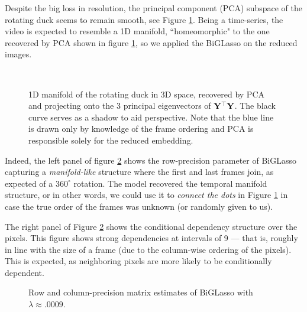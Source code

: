     Despite the big loss in resolution, the principal component (PCA) subspace of the rotating duck seems to remain smooth, see Figure \ref{fig:duck_manifold}.
    Being a time-series, the video is expected to resemble a 1D manifold, ``homeomorphic" to the one recovered by PCA shown in figure \ref{fig:duck_manifold}, so we applied the BiGLasso on the reduced images.
    \begin{figure}[ht]
      \centering
      \\
      \caption[1D manifold of the rotating duck in 3D space, recovered by PCA.]{ \label{fig:duck_manifold}
	1D manifold of the rotating duck in 3D space, recovered by PCA and projecting onto the 3 principal eigenvectors {\color{black}of $\mathbf{Y}^\top\mathbf{Y}$.
	The black curve serves as a shadow to aid perspective.
	Note that the blue line is drawn only by knowledge of the frame ordering and PCA is responsible solely for the reduced embedding.}
      }
    \end{figure}
    
    
    Indeed, the left panel of figure \ref{fig:frameNet_pixNet} shows the row-precision parameter of BiGLasso capturing a \emph{manifold-like} structure where the first and last frames join, as expected of a $360^{\circ}$ rotation.
    The model recovered the temporal manifold structure, or in other words, we could use it to \emph{connect the dots} in Figure \ref{fig:duck_manifold} in case the true order of the frames was unknown (or randomly given to us).
    
    The right panel of Figure \ref{fig:frameNet_pixNet} shows the conditional dependency structure over the pixels.
    This figure shows strong dependencies at intervals of 9 --- {\color{black} that is, roughly in line with} the size of a frame (due to the column-wise ordering of the pixels).
    This is expected, as neighboring pixels are more likely to be conditionally dependent.
    \begin{figure}[ht]
      \centering
      \caption[Row and column-precision matrix estimates of BiGLasso.]{ \label{fig:frameNet_pixNet}
        Row and column-precision matrix estimates of BiGLasso with $\lambda \approx .0009$.
      }
    \end{figure}
    
